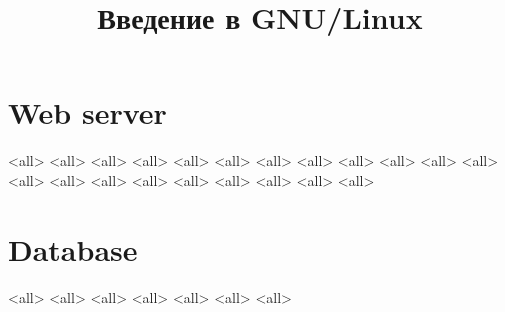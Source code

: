 

\title{Введение в GNU/Linux}




\begin{frame}
	\frametitle{}
	\titlepage
	\vspace{-0.5cm}
	\begin{center}
	\end{center}
\end{frame}


\begin{frame}
	\tableofcontents
	[hideallsubsections]
\end{frame}


\section{Web server}
\mode<all>{}
\mode<all>{}
\mode<all>{}
\mode<all>{}
\mode<all>{}
\mode<all>{}
\mode<all>{}
\mode<all>{}
\mode<all>{}
\mode<all>{}
\mode<all>{}
\mode<all>{}
\mode<all>{}
\mode<all>{}
\mode<all>{}
\mode<all>{}
\mode<all>{}
\mode<all>{}
\mode<all>{}
\mode<all>{}
\mode<all>{}


\section{Database}
\mode<all>{}
\mode<all>{}
\mode<all>{}
\mode<all>{}
\mode<all>{}
\mode<all>{}
\mode<all>{}


